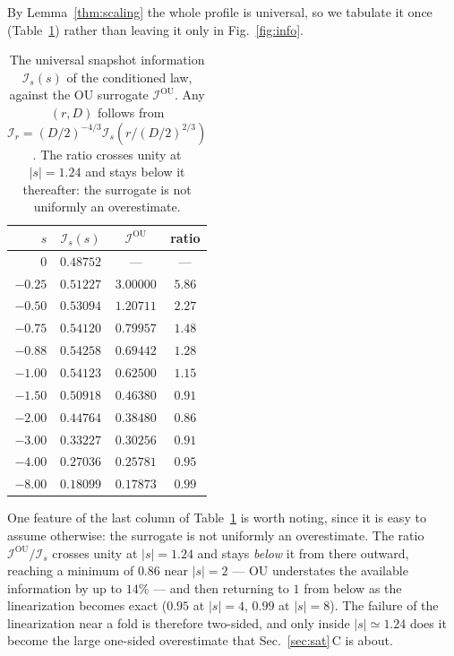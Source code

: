 \documentclass[%
 aip,
 cha,
 amsmath,amssymb,
 reprint,
 superscriptaddress,
 floatfix,
]{revtex4-2}
\newcommand{\Ifish}{\mathcal{I}}
\begin{document}
By Lemma~\ref{thm:scaling} the whole profile is universal, so we tabulate it once (Table~\ref{tab:profile}) rather than leaving it only in Fig.~\ref{fig:info}.
\begin{table}[b]
\caption{\label{tab:profile}%
The universal snapshot information $\Ifish_s(s)$ of the conditioned law, against the OU surrogate $\Ifish^{\mathrm{OU}}$.  Any $(r,D)$ follows from $\Ifish_r=(D/2)^{-4/3}\Ifish_s(r/(D/2)^{2/3})$.  The ratio crosses unity at $|s|=1.24$ and stays below it thereafter: the surrogate is not uniformly an overestimate.}
\begin{ruledtabular}
\begin{tabular}{rccc}
\hline
$s$ & $\Ifish_s(s)$ & $\Ifish^{\mathrm{OU}}$ & ratio \\
\hline
$0$      & $0.48752$ & --- & --- \\
$-0.25$  & $0.51227$ & $3.00000$ & $5.86$ \\
$-0.50$  & $0.53094$ & $1.20711$ & $2.27$ \\
$-0.75$  & $0.54120$ & $0.79957$ & $1.48$ \\
$-0.88$  & $0.54258$ & $0.69442$ & $1.28$ \\
$-1.00$  & $0.54123$ & $0.62500$ & $1.15$ \\
$-1.50$  & $0.50918$ & $0.46380$ & $0.91$ \\
$-2.00$  & $0.44764$ & $0.38480$ & $0.86$ \\
$-3.00$  & $0.33227$ & $0.30256$ & $0.91$ \\
$-4.00$  & $0.27036$ & $0.25781$ & $0.95$ \\
$-8.00$  & $0.18099$ & $0.17873$ & $0.99$ \\
\end{tabular}
\end{ruledtabular}
\end{table}
One feature of the last column of Table~\ref{tab:profile} is worth noting, since it is easy to assume otherwise: the surrogate is not uniformly an overestimate.  The ratio $\Ifish^{\mathrm{OU}}/\Ifish_s$ crosses unity at $|s|=1.24$ and stays \emph{below} it from there outward, reaching a minimum of $0.86$ near $|s|=2$ --- OU understates the available information by up to $14\%$ --- and then returning to $1$ from below as the linearization becomes exact ($0.95$ at $|s|=4$, $0.99$ at $|s|=8$).  The failure of the linearization near a fold is therefore two-sided, and only inside $|s|\simeq1.24$ does it become the large one-sided overestimate that Sec.~\ref{sec:sat}\,C is about.
\end{document}
